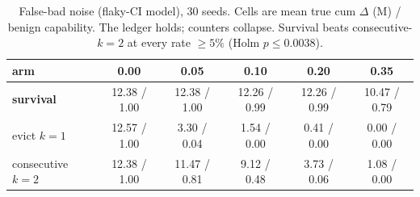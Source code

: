 \begin{table}[t]
\centering
\tabsize
\caption{False-bad noise (flaky-CI model), 30 seeds. Cells are mean true
cum $\Delta$ (M) / benign capability. The ledger holds; counters
collapse. Survival beats consecutive-$k{=}2$ at every rate $\ge 5\%$
(Holm $p \le 0.0038$).}
\label{tab:noise}
\begin{tabular}{lccccc}
\toprule
arm & 0.00 & 0.05 & 0.10 & 0.20 & 0.35 \\
\midrule
\textbf{survival}     & 12.38 / 1.00 & 12.38 / 1.00 & 12.26 / 0.99 & 12.26 / 0.99 & 10.47 / 0.79 \\
evict $k{=}1$         & 12.57 / 1.00 & 3.30 / 0.04  & 1.54 / 0.00  & 0.41 / 0.00  & 0.00 / 0.00 \\
consecutive $k{=}2$   & 12.38 / 1.00 & 11.47 / 0.81 & 9.12 / 0.48  & 3.73 / 0.06  & 1.08 / 0.00 \\
\bottomrule
\end{tabular}
\end{table}
